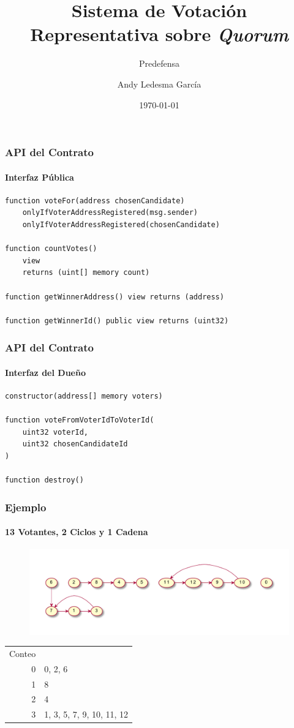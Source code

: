 \documentclass{beamer}
\title{Sistema de Votaci\'on Representativa sobre \textit{Quorum}}
\subtitle{Predefensa}
\author{Andy Ledesma Garc\'ia}
\institute{Universidad de La Habana}
\date{\today}
\begin{document}
\begin{frame}
    \titlepage
\end{frame}

\begin{frame}[fragile]
    \frametitle{API del Contrato}
    \framesubtitle{Interfaz P\'ublica}

    \begin{lstlisting}[language=Solidity]
function voteFor(address chosenCandidate) 
    onlyIfVoterAddressRegistered(msg.sender)
    onlyIfVoterAddressRegistered(chosenCandidate) 

function countVotes() 
    view 
    returns (uint[] memory count) 

function getWinnerAddress() view returns (address) 

function getWinnerId() public view returns (uint32)   
    \end{lstlisting}

\end{frame}

\begin{frame}[fragile]
    \frametitle{API del Contrato}
    \framesubtitle{Interfaz del Due\~no}

    \begin{lstlisting}[language=Solidity]
constructor(address[] memory voters) 

function voteFromVoterIdToVoterId(
    uint32 voterId, 
    uint32 chosenCandidateId
) 

function destroy()
    \end{lstlisting}

\end{frame}

\begin{frame}
    \frametitle{Ejemplo}
    \framesubtitle{13 Votantes, 2 Ciclos y 1 Cadena}

    \begin{figure}
        \includegraphics[scale=.5]{graphics/example.pdf}
        \centering
    \end{figure}

    \begin{center}
        \begin{tabular}{r|l}
            Conteo & \\
            0 & 0, 2, 6  \\  
            1 & 8        \\   
            2 & 4        \\   
            3 & 1, 3, 5, 7, 9, 10, 11, 12  
        \end{tabular}
    \end{center}
\end{frame}
\end{document}
